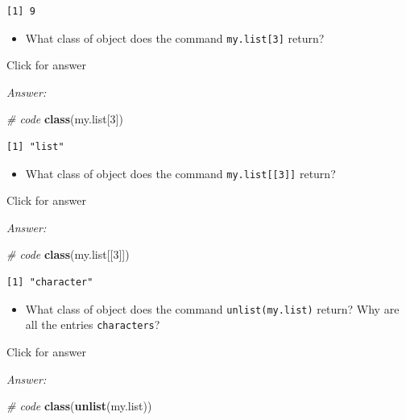 \documentclass[
]{book}
\newenvironment{Shaded}{\begin{snugshade}}{\end{snugshade}}
\newcommand{\CommentTok}[1]{\textcolor[rgb]{0.56,0.35,0.01}{\textit{#1}}}
\newcommand{\DecValTok}[1]{\textcolor[rgb]{0.00,0.00,0.81}{#1}}
\newcommand{\FunctionTok}[1]{\textcolor[rgb]{0.13,0.29,0.53}{\textbf{#1}}}
\newcommand{\NormalTok}[1]{#1}
\providecommand{\tightlist}{%
  \setlength{\itemsep}{0pt}\setlength{\parskip}{0pt}}
\begin{document}
\begin{verbatim}
[1] 9
\end{verbatim}

\begin{itemize}
\tightlist
\item
  What class of object does the command \texttt{my.list{[}3{]}} return?
\end{itemize}

Click for answer

\emph{Answer:}

\begin{Shaded}
\begin{Highlighting}[]
\CommentTok{\# code}
\FunctionTok{class}\NormalTok{(my.list[}\DecValTok{3}\NormalTok{])}
\end{Highlighting}
\end{Shaded}

\begin{verbatim}
[1] "list"
\end{verbatim}

\begin{itemize}
\tightlist
\item
  What class of object does the command \texttt{my.list{[}{[}3{]}{]}} return?
\end{itemize}

Click for answer

\emph{Answer:}

\begin{Shaded}
\begin{Highlighting}[]
\CommentTok{\# code}
\FunctionTok{class}\NormalTok{(my.list[[}\DecValTok{3}\NormalTok{]])}
\end{Highlighting}
\end{Shaded}

\begin{verbatim}
[1] "character"
\end{verbatim}

\begin{itemize}
\tightlist
\item
  What class of object does the command \texttt{unlist(my.list)} return? Why are all the entries \texttt{characters}?
\end{itemize}

Click for answer

\emph{Answer:}

\begin{Shaded}
\begin{Highlighting}[]
\CommentTok{\# code}
\FunctionTok{class}\NormalTok{(}\FunctionTok{unlist}\NormalTok{(my.list))}
\end{Highlighting}
\end{Shaded}
\end{document}
